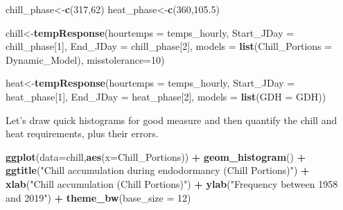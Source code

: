 \documentclass[
]{book}
\newenvironment{Shaded}{\begin{snugshade}}{\end{snugshade}}
\newcommand{\DataTypeTok}[1]{\textcolor[rgb]{0.13,0.29,0.53}{#1}}
\newcommand{\DecValTok}[1]{\textcolor[rgb]{0.00,0.00,0.81}{#1}}
\newcommand{\FloatTok}[1]{\textcolor[rgb]{0.00,0.00,0.81}{#1}}
\newcommand{\KeywordTok}[1]{\textcolor[rgb]{0.13,0.29,0.53}{\textbf{#1}}}
\newcommand{\NormalTok}[1]{#1}
\newcommand{\OperatorTok}[1]{\textcolor[rgb]{0.81,0.36,0.00}{\textbf{#1}}}
\newcommand{\StringTok}[1]{\textcolor[rgb]{0.31,0.60,0.02}{#1}}
\begin{document}
\begin{Shaded}
\begin{Highlighting}[]
\NormalTok{chill_phase<-}\KeywordTok{c}\NormalTok{(}\DecValTok{317}\NormalTok{,}\DecValTok{62}\NormalTok{)}
\NormalTok{heat_phase<-}\KeywordTok{c}\NormalTok{(}\DecValTok{360}\NormalTok{,}\FloatTok{105.5}\NormalTok{)}

\NormalTok{chill<-}\KeywordTok{tempResponse}\NormalTok{(}\DataTypeTok{hourtemps =}\NormalTok{ temps_hourly,}
                    \DataTypeTok{Start_JDay =}\NormalTok{ chill_phase[}\DecValTok{1}\NormalTok{],}
                    \DataTypeTok{End_JDay =}\NormalTok{ chill_phase[}\DecValTok{2}\NormalTok{],}
                    \DataTypeTok{models =} \KeywordTok{list}\NormalTok{(}\DataTypeTok{Chill_Portions =}\NormalTok{ Dynamic_Model),}
                    \DataTypeTok{misstolerance=}\DecValTok{10}\NormalTok{)}

\NormalTok{heat<-}\KeywordTok{tempResponse}\NormalTok{(}\DataTypeTok{hourtemps =}\NormalTok{ temps_hourly,}
                    \DataTypeTok{Start_JDay =}\NormalTok{ heat_phase[}\DecValTok{1}\NormalTok{],}
                    \DataTypeTok{End_JDay =}\NormalTok{ heat_phase[}\DecValTok{2}\NormalTok{],}
                    \DataTypeTok{models =} \KeywordTok{list}\NormalTok{(}\DataTypeTok{GDH =}\NormalTok{ GDH))}
\end{Highlighting}
\end{Shaded}

Let's draw quick histograms for good measure and then quantify the chill and heat requirements, plus their errors.

\begin{Shaded}
\begin{Highlighting}[]
\KeywordTok{ggplot}\NormalTok{(}\DataTypeTok{data=}\NormalTok{chill,}\KeywordTok{aes}\NormalTok{(}\DataTypeTok{x=}\NormalTok{Chill_Portions)) }\OperatorTok{+}
\StringTok{  }\KeywordTok{geom_histogram}\NormalTok{() }\OperatorTok{+}
\StringTok{  }\KeywordTok{ggtitle}\NormalTok{(}\StringTok{"Chill accumulation during endodormancy (Chill Portions)"}\NormalTok{) }\OperatorTok{+}
\StringTok{  }\KeywordTok{xlab}\NormalTok{(}\StringTok{"Chill accumulation (Chill Portions)"}\NormalTok{) }\OperatorTok{+}
\StringTok{  }\KeywordTok{ylab}\NormalTok{(}\StringTok{"Frequency between 1958 and 2019"}\NormalTok{) }\OperatorTok{+}
\StringTok{  }\KeywordTok{theme_bw}\NormalTok{(}\DataTypeTok{base_size =} \DecValTok{12}\NormalTok{)}
\end{Highlighting}
\end{Shaded}
\end{document}
